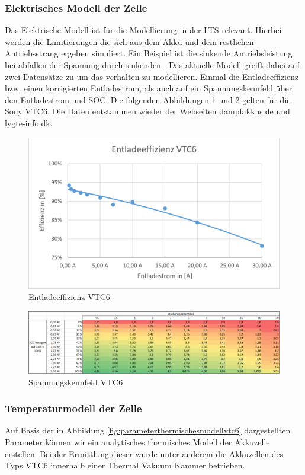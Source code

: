 \subsubsection{Elektrisches Modell der Zelle}
Das Elektrische Modell ist für die Modellierung in der \ac{LTS} relevant. Hierbei werden die Limitierungen die sich aus dem Akku und dem restlichen Antriebsstrang ergeben simuliert. Ein Beispiel ist die sinkende Antriebsleistung bei abfallen der Spannung durch sinkenden . Das aktuelle Modell greift dabei auf zwei Datensätze zu um das verhalten zu modellieren. Einmal die Entladeeffizienz bzw. einen korrigierten Entladestrom, als auch auf ein Spannungskennfeld über den Entladestrom und \ac{SOC}. Die folgenden Abbildungen \ref{fig:Entladeeffizienz_VTC6} und \ref{fig:Spannung_ueber_SOC_Strom} gelten für die Sony VTC6. Die Daten entstammen wieder der Webseiten dampfakkus.de und lygte-info.dk.
\begin{figure}[h]
	\centering
	\includegraphics[width=0.7\linewidth]{bilder/Entladeeffizienz_VTC6}
	\caption{Entladeeffizienz VTC6}
	\label{fig:Entladeeffizienz_VTC6}
\end{figure}
\begin{figure}[h]
	\centering
	\includegraphics[width=0.7\linewidth]{bilder/Spannung_ueber_SOC_Strom}
	\caption{Spannungskennfeld VTC6}
	\label{fig:Spannung_ueber_SOC_Strom}
\end{figure}
\FloatBarrier
\subsubsection{Temperaturmodell der Zelle}
Auf Basis der in Abbildung \ref{fig:parameterthermischesmodellvtc6} dargestellten Parameter  können wir ein analytisches thermisches Modell der Akkuzelle erstellen. Bei der Ermittlung dieser wurde unter anderem die Akkuzellen des Typs VTC6 innerhalb einer Thermal Vakuum Kammer betrieben.

